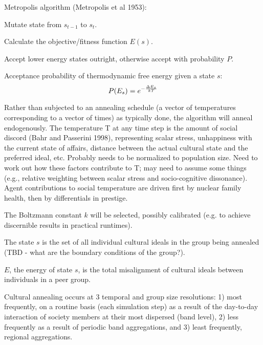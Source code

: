 \documentclass[11pt,oneside,a4paper,onecolumn]{article}
\begin{document}
{Metropolis algorithm (Metropolis et al 1953)}:
\begin{enumerate*} 
	\item Mutate state from $s_{t-1}$ to $s_{t}$.\\
	\item Calculate the objective/fitness function $E(s)$.\\
	\item Accept lower energy states outright, otherwise accept with probability $P$.
\end{enumerate*}

Acceptance probability of thermodynamic free energy given a state $s$:\\
\begin{equation}
	\centering
	P(E_s) = e^{-\frac{\Delta E_s}{kT}}
\end{equation}

Rather than subjected to an annealing schedule (a vector of temperatures corresponding to a vector of times) as typically done, the algorithm will anneal endogenously.  The temperature T at any time step is the amount of social discord (Bahr and Passerini 1998), representing scalar stress, unhappiness with the current state of affairs, distance between the actual cultural state and the preferred ideal, etc.  Probably needs to be normalized to population size.  Need to work out how these factors contribute to T; may need to assume some things (e.g., relative weighting between scalar stress and socio-cognitive dissonance).\\

Agent contributions to social temperature are driven first by nuclear family health, then by differentials in prestige.

The Boltzmann constant $k$ will be selected, possibly calibrated (e.g. to achieve discernible results in practical runtimes).

The state $s$ is the set of all individual cultural ideals in the group being annealed (TBD - what are the boundary conditions of the group?).

$E$, the energy of state $s$, is the total misalignment of cultural ideals between individuals in a peer group.

Cultural annealing occurs at 3 temporal and group size resolutions:  1) most frequently, on a routine basis (each simulation step) as a result of the day-to-day interaction of society members at their most dispersed (band level), 2) less frequently as a result of periodic band aggregations, and 3) least frequently, regional aggregations.
\end{document}
